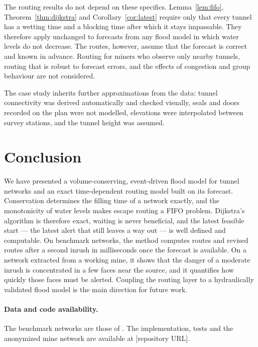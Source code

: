 \documentclass[11pt,a4paper]{article}
\theoremstyle{plain}
\theoremstyle{definition}
\theoremstyle{remark}
\begin{document}
The routing results do not depend on these specifics. Lemma~\ref{lem:fifo}, Theorem~\ref{thm:dijkstra} and Corollary~\ref{cor:latest} require only that every tunnel has a wetting time and a blocking time after which it stays impassable. They therefore apply unchanged to forecasts from any flood model in which water levels do not decrease. The routes, however, assume that the forecast is correct and known in advance. Routing for miners who observe only nearby tunnels, routing that is robust to forecast errors, and the effects of congestion and group behaviour \cite{hamacher, lu} are not considered.

The case study inherits further approximations from the data: tunnel connectivity was derived automatically and checked visually, seals and doors recorded on the plan were not modelled, elevations were interpolated between survey stations, and the tunnel height was assumed.

\section{Conclusion}\label{sec:conclusion}

We have presented a volume-conserving, event-driven flood model for tunnel networks and an exact time-dependent routing model built on its forecast. Conservation determines the filling time of a network exactly, and the monotonicity of water levels makes escape routing a FIFO problem. Dijkstra's algorithm is therefore exact, waiting is never beneficial, and the latest feasible start --- the latest alert that still leaves a way out --- is well defined and computable. On benchmark networks, the method computes routes and revised routes after a second inrush in milliseconds once the forecast is available. On a network extracted from a working mine, it shows that the danger of a moderate inrush is concentrated in a few faces near the source, and it quantifies how quickly those faces must be alerted. Coupling the routing layer to a hydraulically validated flood model is the main direction for future work.

\paragraph{Data and code availability.} The benchmark networks are those of \cite{cumcm}. The implementation, tests and the anonymized mine network are available at [repository URL].
\end{document}
